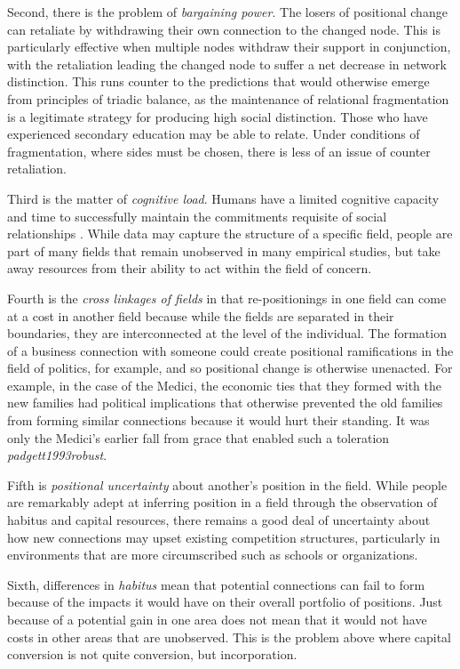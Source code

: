 \documentclass[12pt]{article}
\begin{document}
Second, there is the problem of \textit{bargaining power}. The losers of positional change can retaliate by withdrawing their own connection to the changed node. This is particularly effective when multiple nodes withdraw their support in conjunction, with the retaliation leading the changed node to suffer a net decrease in network distinction. This runs counter to the predictions that would otherwise emerge from principles of triadic balance, as the maintenance of relational fragmentation is a legitimate strategy for producing high social distinction. Those who have experienced secondary education may be able to relate. Under conditions of fragmentation, where sides must be chosen, there is less of an issue of counter retaliation.

Third is the matter of \textit{cognitive load}. Humans have a limited cognitive capacity and time to successfully maintain the commitments requisite of social relationships \citep{dunbar1995neocortex}. While data may capture the structure of a specific field, people are part of many fields that remain unobserved in many empirical studies, but take away resources from their ability to act within the field of concern.

Fourth is the \textit{cross linkages of fields} in that re-positionings in one field can come at a cost in another field because while the fields are separated in their boundaries, they are interconnected at the level of the individual. The formation of a business connection with someone could create positional ramifications in the field of politics, for example, and so positional change is otherwise unenacted. For example, in the case of the Medici, the economic ties that they formed with the new families had political implications that otherwise prevented the old families from forming similar connections because it would hurt their standing. It was only the Medici's earlier fall from grace that enabled such a toleration \textit{padgett1993robust}.  

Fifth is \textit{positional uncertainty} about another's position in the field. While people are remarkably adept at inferring position in a field through the observation of habitus and capital resources, there remains a good deal of uncertainty about how new connections may upset existing competition structures, particularly in environments that are more circumscribed such as schools or organizations.     

Sixth, differences in \textit{habitus} mean that potential connections can fail to form because of the impacts it would have on their overall portfolio of positions. Just because of a potential gain in one area does not mean that it would not have costs in other areas that are unobserved. This is the problem above where capital conversion is not quite conversion, but incorporation.  
\end{document}
